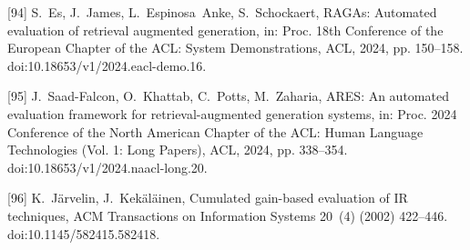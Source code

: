 \documentclass[11pt]{article}
\begin{document}
[94] 
S.~Es, J.~James, L.~Espinosa~Anke, S.~Schockaert, {RAGAs}: Automated evaluation
  of retrieval augmented generation, in: Proc. 18th Conference of the European
  Chapter of the ACL: System Demonstrations, ACL, 2024, pp. 150--158.
  doi:10.18653/v1/2024.eacl-demo.16.



[95] 
J.~Saad-Falcon, O.~Khattab, C.~Potts, M.~Zaharia, {ARES}: An automated
  evaluation framework for retrieval-augmented generation systems, in: Proc.
  2024 Conference of the North American Chapter of the ACL: Human Language
  Technologies (Vol. 1: Long Papers), ACL, 2024, pp. 338--354.
  doi:10.18653/v1/2024.naacl-long.20.



[96] 
K.~J{\"a}rvelin, J.~Kek{\"a}l{\"a}inen, Cumulated gain-based evaluation of {IR}
  techniques, ACM Transactions on Information Systems 20~(4) (2002) 422--446.
  doi:10.1145/582415.582418.
\end{document}
